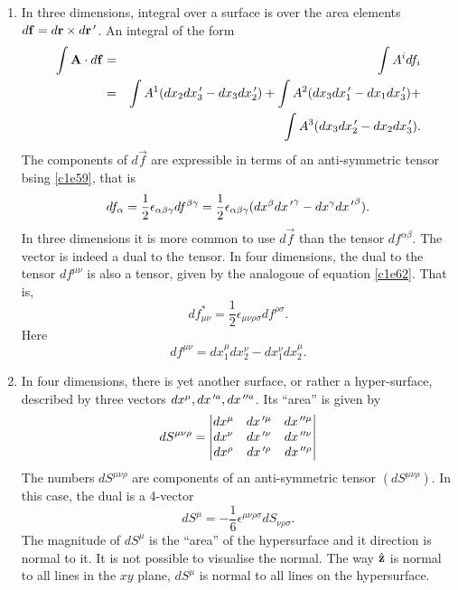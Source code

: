 \begin{enumerate}
\begin{enumerate}
\item In three dimensions, integral over a surface is over the area elements 
$d\mathbf{f} = d\mathbf{r} \times d\mathbf{r}^{\,\prime}$. An integral of the form
\begin{eqnarray*}
\int \mathbf{A}\cdot d\mathbf{f} &=& \int A^i df_i \\
 &=& \int A^1(dx_2dx_3^{\,\prime} - dx_3dx_2^{\,\prime}) + 
     \int A^2(dx_3dx_1^{\,\prime} - dx_1dx_3^{\,\prime}) + \\
 & & \int A^3(dx_3dx_2^{\,\prime} - dx_2dx_3^{\,\prime}).
\end{eqnarray*}
The components of $d\vec{f}$ are expressible in terms of an anti-symmetric 
tensor bsing \eqref{c1e59}, that is
\begin{equation}\label{c1e68}
df_\alpha = \frac{1}{2}\epsilon_{\alpha\beta\gamma}df^{\beta\gamma} = 
\frac{1}{2}\epsilon_{\alpha\beta\gamma}(dx^\beta d{x^{\,\prime}}^\gamma - 
dx^\gamma d{x^{\,\prime}}^\beta).
\end{equation}
In three dimensions it is more common to use $d\vec{f}$ than the tensor 
$df^{\alpha\beta}$.  The vector is indeed a dual to the tensor. In four 
dimensions, the dual to the tensor $df^{\mu\nu}$ is also a tensor, given by the 
analogoue of equation \eqref{c1e62}. 
That is,
\begin{equation}\label{c1e69}
df^\ast_{\mu\nu} = \frac{1}{2}\epsilon_{\mu\nu\rho\sigma}df^{\rho\sigma}.
\end{equation}
Here
\begin{equation}\label{c1e70}
df^{\mu\nu} = dx_1^\mu dx_2^\nu - dx_1^\nu dx_2^\mu.
\end{equation}

\item In four dimensions, there is yet another surface, or rather a 
hyper-surface, described by three vectors $dx^\mu, dx^{{\,\prime} a}, dx^{{\,\prime\prime} a}$. Its 
``area'' is given by
\begin{equation}\label{c1e71}
dS^{\mu\nu\rho} = \begin{vmatrix}
dx^\mu & dx^{{\,\prime} \mu} & dx^{{\,\prime\prime} \mu} \\
dx^\nu & dx^{{\,\prime} \nu} & dx^{{\,\prime\prime} \nu} \\
dx^\rho & dx^{{\,\prime} \rho} & dx^{{\,\prime\prime} \rho}
\end{vmatrix}
\end{equation}
The numbers $dS^{\mu\nu\rho}$ are components of an anti-symmetric tensor 
$(dS^{\mu\nu\rho})$. In this case, the dual is a 4-vector
\begin{equation}\label{c1e72}
dS^\mu = -\frac{1}{6}\epsilon^{\mu\nu\rho\sigma}dS_{\nu\rho\sigma}.
\end{equation}
The magnitude of $dS^\mu$ is the ``area'' of the hypersurface and it direction
is normal to it. It is not possible to visualise the normal. The way $\hat{\mathbf{z}}$ is
normal to all lines in the $xy$ plane, $dS^\mu$ is normal to all lines on the
hypersurface.


\end{enumerate}
\end{enumerate}
